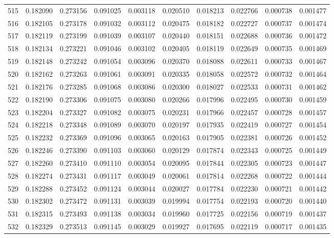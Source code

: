 \begin{tabular}{lrrrrrrrrr}
515 & 0.182090 & 0.273156 & 0.091025 & 0.003118 & 0.020510 & 0.018213 & 0.022766 & 0.000738 & 0.001477 \\
516 & 0.182105 & 0.273178 & 0.091032 & 0.003112 & 0.020475 & 0.018182 & 0.022727 & 0.000737 & 0.001474 \\
517 & 0.182119 & 0.273199 & 0.091039 & 0.003107 & 0.020440 & 0.018151 & 0.022688 & 0.000736 & 0.001472 \\
518 & 0.182134 & 0.273221 & 0.091046 & 0.003102 & 0.020405 & 0.018119 & 0.022649 & 0.000735 & 0.001469 \\
519 & 0.182148 & 0.273242 & 0.091054 & 0.003096 & 0.020370 & 0.018088 & 0.022611 & 0.000733 & 0.001467 \\
520 & 0.182162 & 0.273263 & 0.091061 & 0.003091 & 0.020335 & 0.018058 & 0.022572 & 0.000732 & 0.001464 \\
521 & 0.182176 & 0.273285 & 0.091068 & 0.003086 & 0.020300 & 0.018027 & 0.022533 & 0.000731 & 0.001462 \\
522 & 0.182190 & 0.273306 & 0.091075 & 0.003080 & 0.020266 & 0.017996 & 0.022495 & 0.000730 & 0.001459 \\
523 & 0.182204 & 0.273327 & 0.091082 & 0.003075 & 0.020231 & 0.017966 & 0.022457 & 0.000728 & 0.001457 \\
524 & 0.182218 & 0.273348 & 0.091089 & 0.003070 & 0.020197 & 0.017935 & 0.022419 & 0.000727 & 0.001454 \\
525 & 0.182232 & 0.273369 & 0.091096 & 0.003065 & 0.020163 & 0.017905 & 0.022381 & 0.000726 & 0.001452 \\
526 & 0.182246 & 0.273390 & 0.091103 & 0.003060 & 0.020129 & 0.017874 & 0.022343 & 0.000725 & 0.001449 \\
527 & 0.182260 & 0.273410 & 0.091110 & 0.003054 & 0.020095 & 0.017844 & 0.022305 & 0.000723 & 0.001447 \\
528 & 0.182274 & 0.273431 & 0.091117 & 0.003049 & 0.020061 & 0.017814 & 0.022268 & 0.000722 & 0.001444 \\
529 & 0.182288 & 0.273452 & 0.091124 & 0.003044 & 0.020027 & 0.017784 & 0.022230 & 0.000721 & 0.001442 \\
530 & 0.182302 & 0.273472 & 0.091131 & 0.003039 & 0.019994 & 0.017754 & 0.022193 & 0.000720 & 0.001440 \\
531 & 0.182315 & 0.273493 & 0.091138 & 0.003034 & 0.019960 & 0.017725 & 0.022156 & 0.000719 & 0.001437 \\
532 & 0.182329 & 0.273513 & 0.091145 & 0.003029 & 0.019927 & 0.017695 & 0.022119 & 0.000717 & 0.001435 \\

\end{tabular}
